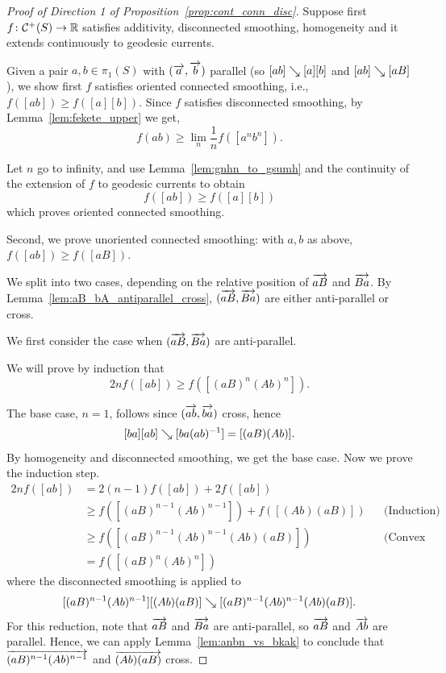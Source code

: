 \begin{proof}[Proof of Direction 1 of Proposition~\ref{prop:cont_conn_disc}]
		
Suppose first $f \colon \mathcal{C}^+(S) \to \mathbb{R}$ satisfies additivity, disconnected smoothing, homogeneity and it extends continuously to geodesic currents.

			Given a pair $a, b \in \pi_1(S)$ with $(\overrightarrow{a},\overrightarrow{b})$ parallel (so
			$[ab] \mathrel{\searrow} [a][b]$ and $[ab]\mathrel{\searrow}[aB]$), we show first $f$
			satisfies oriented connected
			smoothing, i.e., $f([ab]) \geq f([a][b])$.
            Since $f$ satisfies disconnected smoothing, by Lemma~\ref{lem:fekete_upper} we get, 
\begin{equation}\label{eq:power_ineq}
				f(ab)  \geq \lim_n \frac{1}{n} f([a^{n}b^{n}]).
			\end{equation}

			Let $n$ go to infinity, and
			use Lemma~\ref{lem:gnhn_to_gsumh} and the continuity of the extension of $f$ to geodesic currents to obtain
			\[
			f([ab]) \geq f([a] [b])
			\]
			which proves oriented connected smoothing.
			
Second, we prove unoriented connected smoothing: with $a,b$ as above,
			$f([ab]) \ge f([aB])$.

			We split into two cases, depending on the relative position of $\overrightarrow{aB}$
			and $\overrightarrow{Ba}$. By
			Lemma~\ref{lem:aB_bA_antiparallel_cross}, $(\overrightarrow{aB},\overrightarrow{Ba})$ are either anti-parallel
			or cross.

                We first consider the case when $(\overrightarrow{aB},\overrightarrow{Ba})$ are anti-parallel.

                We will prove by induction that
				\begin{equation}
					2nf([ab]) \geq f([(aB)^n (Ab)^n]).
					\label{eq:antiparallel_induction}
				\end{equation}

                				The base case, $n=1$, follows since $(\overrightarrow{ab},\overrightarrow{ba})$ cross, hence
				\[
				[ba][ab] \mathrel{\searrow} [ba(ab)^{-1}] = [(aB)(Ab)].
				\]
				By homogeneity and disconnected smoothing, we get the base case.
           Now we prove the induction step.
\begin{align*}
2nf([ab])
&= 2(n-1)f([ab]) + 2f([ab]) \\
&\geq f([(aB)^{n-1} (Ab)^{n-1}]) + f([(Ab)(aB)]) && \text{(Induction)} \\
&\geq f([(aB)^{n-1} (Ab)^{n-1} (Ab)(aB)])
&& \text{(Convex union and disconnected smoothing)} \\
&= f([(aB)^n (Ab)^n])
\end{align*}
				where the disconnected smoothing is applied to
				\[[(aB)^{n-1}(Ab)^{n-1}][(Ab)(aB)] \mathrel{\searrow} [(aB)^{n-1} (Ab)^{n-1}
				(Ab)(aB)].
				\]
				 For this reduction, note that $\overrightarrow{aB}$ and $\overrightarrow{Ba}$ are
				anti-parallel, so $\overrightarrow{aB}$ and $\overrightarrow{Ab}$ are parallel. Hence, we
				can apply Lemma~\ref{lem:anbn_vs_bkak} to conclude that
				$\overrightarrow{(aB)^{n-1} (Ab)^{n-1}}$ and $\overrightarrow{(Ab)(aB)}$ cross.


\end{proof}
